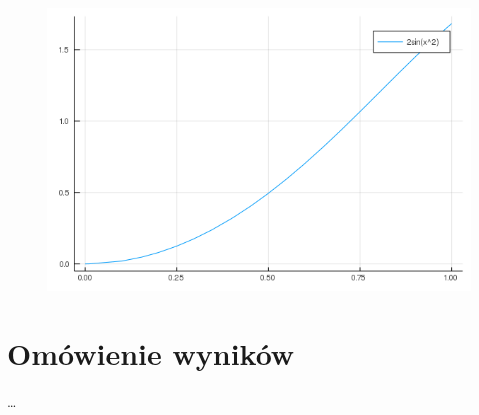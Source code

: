 \documentclass{article}
\begin{document}
\begin{figure}[ht]
    \includegraphics[scale=0.5]{WykresSnew.png}
    \label{WykresSnew}
\end{figure}
\section*{Omówienie wyników}
\dots
\end{document}
